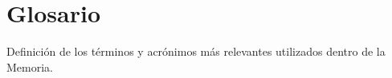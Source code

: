 \documentclass[IB]{TFUOC}%
\begin{document}


\chapter{Glosario}

Definición de los términos y acrónimos más relevantes utilizados dentro de la Memoria.

\fi



\end{document}
